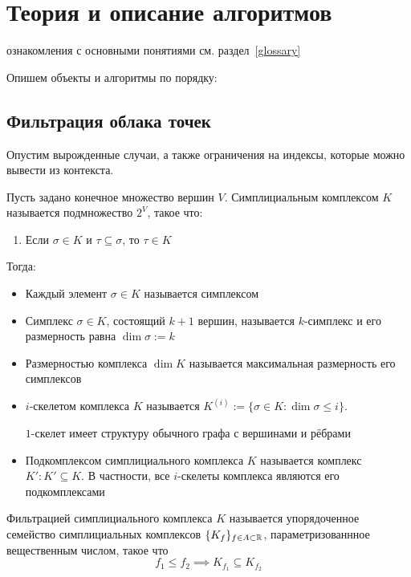 \documentclass{article}
\begin{document}
\section{Теория и описание алгоритмов}
{ ознакомления с основными понятиями см. раздел~\ref{glossary}}

Опишем объекты и алгоритмы по порядку:
\subsection{Фильтрация облака точек}
Опустим вырожденные случаи, а также ограничения на индексы, которые можно вывести из контекста.
\begin{definition}
  Пусть задано конечное множество вершин $V$. Симплициальным комплексом $K$ называется подмножество $2^V$, такое что:
  \begin{enumerate}
    \item Если $\sigma \in K$ и $\tau \subseteq \sigma$, то $\tau \in K$
  \end{enumerate}
  Тогда:
  \begin{itemize}
    \item Каждый элемент $\sigma \in K$ называется симплексом
    \item Симплекс $\sigma \in K$, состоящий $k+1$ вершин, называется $k$-симплекс и его размерность равна $\dim \sigma := k$
    \item Размерностью комплекса $\dim K$ называется максимальная размерность его симплексов
    \item $i$-скелетом комплекса $K$ называется $K^{(i)} := \{\sigma \in K\colon \dim \sigma \leq i\}$.
    \begin{example}
      $1$-скелет имеет структуру обычного графа с вершинами и рёбрами
    \end{example}
    \item Подкомплексом симплициального комплекса $K$ называется комплекс $K'\colon K'\subseteq K$. В частности, все $i$-скелеты комплекса являются его подкомплексами
\end{itemize}
\end{definition}

\begin{definition}
  Фильтрацией симплициального комплекса $K$ называется упорядоченное семейство симплициальных комплексов $\{K_f\}_{f \in A\subset \mathbb{R}}$, параметризованнное вещественным числом, такое что
  \[f_1 \leq f_2 \implies K_{f_1}\subseteq K_{f_2}\]
\end{definition}
\end{document}
